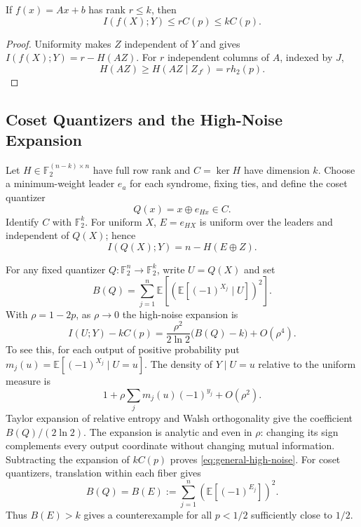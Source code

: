 \begin{proposition}
\label{prop:affine-multibit}
If \(f(x)=Ax+b\) has rank \(r\leq k\), then
\[
 I(f(X);Y)\leq rC(p)\leq kC(p).
\]
\end{proposition}
\begin{proof}
Uniformity makes \(Z\) independent of \(Y\) and gives
\(I(f(X);Y)=r-H(AZ)\).
For \(r\) independent columns of \(A\), indexed by \(J\),
\[
 H(AZ)\geq H(AZ\mid Z_{J^c})=r h_2(p).
\]
\end{proof}

\subsection{Coset Quantizers and the High-Noise Expansion}
\label{subsec:coset-diagnostic}

Let \(H\in\mathbb F_2^{(n-k)\times n}\) have full row rank and
\(C=\ker H\) have dimension \(k\).
Choose a minimum-weight leader \(e_a\) for each syndrome, fixing ties,
and define the coset quantizer
\begin{equation}
 Q(x)=x\oplus e_{Hx}\in C.
 \label{eq:coset-quantizer}
\end{equation}
Identify \(C\) with \(\mathbb F_2^k\). For uniform \(X\),
\(E=e_{HX}\) is uniform over the leaders and independent of \(Q(X)\);
hence
\begin{equation}
 I(Q(X);Y)=n-H(E\oplus Z).
 \label{eq:coset-information}
\end{equation}

For any fixed quantizer \(Q:\mathbb F_2^n\to\mathbb F_2^k\),
write \(U=Q(X)\) and set
\begin{equation}
 B(Q)=\sum_{j=1}^n
 \mathbb E\!\left[\left(\mathbb E[(-1)^{X_j}\mid U]\right)^2\right].
 \label{eq:general-B}
\end{equation}
With \(\rho=1-2p\), as \(\rho\to0\) the high-noise expansion is
\begin{equation}
 I(U;Y)-kC(p)
 =\frac{\rho^2}{2\ln2}\bigl(B(Q)-k\bigr)+O(\rho^4).
 \label{eq:general-high-noise}
\end{equation}
To see this, for each output of positive probability put
\(m_j(u)=\mathbb E[(-1)^{X_j}\mid U=u]\). The density of
\(Y\mid U=u\) relative to the uniform measure is
\[
 1+\rho\sum_jm_j(u)(-1)^{y_j}+O(\rho^2).
\]
Taylor expansion of relative entropy and Walsh orthogonality give
the coefficient \(B(Q)/(2\ln2)\). The expansion is analytic and
even in \(\rho\): changing its sign complements every output
coordinate without changing mutual information. Subtracting the
expansion of \(kC(p)\) proves \eqref{eq:general-high-noise}.
For coset quantizers, translation within each fiber gives
\[
 B(Q)=B(E):=\sum_{j=1}^n\left(\mathbb E[(-1)^{E_j}]\right)^2.
\]
Thus \(B(E)>k\) gives a counterexample for all \(p<1/2\)
sufficiently close to \(1/2\).

